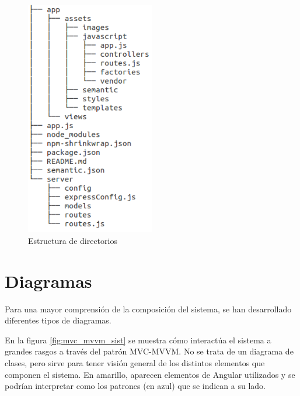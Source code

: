 \begin{figure}[htbp] 
    \centering
    \includegraphics[width=0.5\textwidth]{figuras/directorios.png}
    \caption{Estructura de directorios}
    \label{fig:directorios}
\end{figure}	

\section{Diagramas}
Para una mayor comprensión de la composición del sistema, se han desarrollado diferentes tipos de diagramas.


En la figura \ref{fig:mvc_mvvm_sist} se muestra cómo interactúa el sistema a grandes rasgos a través del patrón MVC-MVVM. No se trata de un diagrama de clases, pero sirve para tener visión general de los distintos elementos que componen el sistema. En amarillo, aparecen elementos de Angular utilizados y se podrían interpretar como los patrones (en azul) que se indican a su lado.


